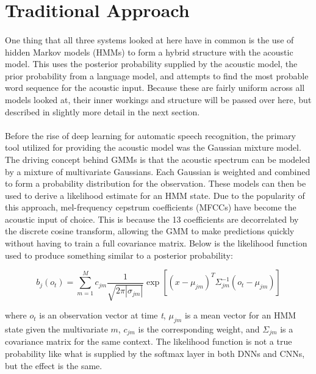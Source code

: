 \documentclass[letterpaper]{article}
\begin{document}
\section*{Traditional Approach}

\paragraph{} One thing that all three systems looked at here have in common is the use of hidden Markov models (HMMs) to form a hybrid structure with the acoustic model. This uses the posterior probability supplied by the acoustic model, the prior probability from a language model, and attempts to find the most probable word sequence for the acoustic input. Because these are fairly uniform across all models looked at, their inner workings and structure will be passed over here, but described in slightly more detail in the next section.

\paragraph{} Before the rise of deep learning for automatic speech recognition, the primary tool utilized for providing the acoustic model was the Gaussian mixture model. The driving concept behind GMMs is that the acoustic spectrum can be modeled by a mixture of multivariate Gaussians. Each Gaussian is weighted and combined to form a probability distribution for the observation. These models can then be used to derive a likelihood estimate for an HMM state. Due to the popularity of this approach, mel-frequency cepstrum coefficients (MFCCs) have become the acoustic input of choice. This is because the 13 coefficients are decorrelated by the discrete cosine transform, allowing the GMM to make predictions quickly without having to train a full covariance matrix. Below is the likelihood function used to produce something similar to a posterior probability:

\begin{equation*}
b_{j}(o_{t}) = \sum_{m=1}^{M}c_{jm}\frac{1}{\sqrt{2\pi|\sigma_{jm}|}}\exp[(x-\mu_{jm})^T\Sigma_{jm}^{-1}(o_{t}-\mu_{jm})]
\end{equation*}

where $o_{t}$ is an observation vector at time \textit{t}, $\mu_{jm}$ is a mean vector for an HMM state given the multivariate $m$, $c_{jm}$ is the corresponding weight, and $\Sigma_{jm}$ is a covariance matrix for the same context. The likelihood function is not a true probability like what is supplied by the softmax layer in both DNNs and CNNs, but the effect is the same.
\end{document}
